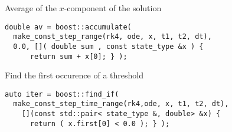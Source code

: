 \begin{frame}[fragile]


\vspace{2ex}

Average of the $x$-component of the solution
\begin{lstlisting}[basicstyle=\footnotesize\ttfamily]
double av = boost::accumulate(
  make_const_step_range(rk4, ode, x, t1, t2, dt),
  0.0, []( double sum , const state_type &x ) {
      return sum + x[0]; } );
\end{lstlisting}

\vspace{2ex}

Find the first occurence of a threshold
\begin{lstlisting}[basicstyle=\footnotesize\ttfamily]
auto iter = boost::find_if(
  make_const_step_time_range(rk4,ode, x, t1, t2, dt),
    [](const std::pair< state_type &, double> &x) {
      return ( x.first[0] < 0.0 ); } );
\end{lstlisting}


\end{frame}






\begin{frame}


\end{frame}

